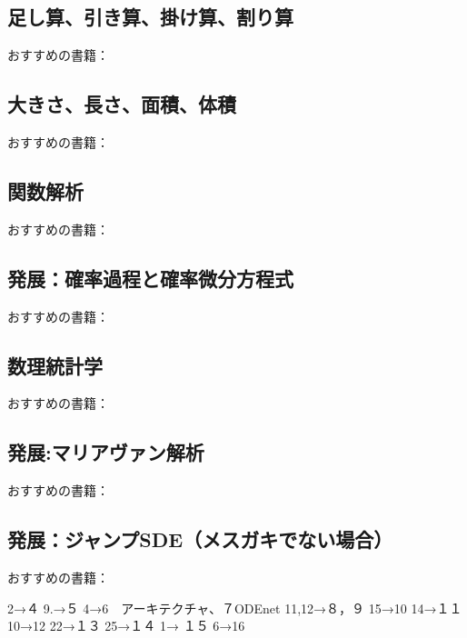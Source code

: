 \documentclass{jsarticle}
\begin{document}
\subsection{足し算、引き算、掛け算、割り算}
おすすめの書籍：



\subsection{大きさ、長さ、面積、体積}
おすすめの書籍：


\subsection{関数解析}
おすすめの書籍：

\subsection{発展：確率過程と確率微分方程式}
おすすめの書籍：

\subsection{数理統計学}
おすすめの書籍：





\subsection{発展:マリアヴァン解析}
おすすめの書籍：

\subsection{発展：ジャンプSDE（メスガキでない場合）}
おすすめの書籍：




2→４
9.→５
4→6　アーキテクチャ、７ODEnet
11,12→８，９
15→10
14→１１
10→12
22→１３
25→１４
1→  １５
6→16
\newpage
\end{document}
